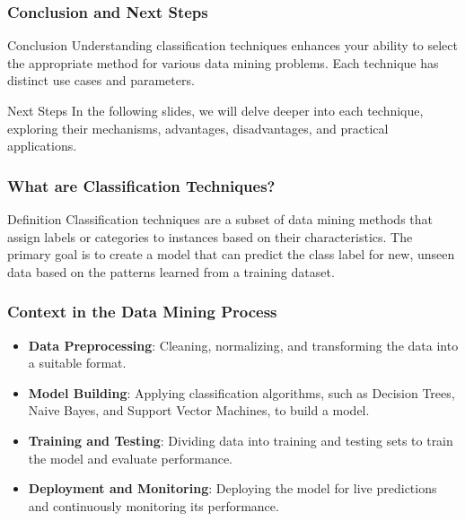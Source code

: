 \documentclass[aspectratio=169]{beamer}
\begin{document}
\begin{frame}[fragile]
    \frametitle{Conclusion and Next Steps}
    \begin{block}{Conclusion}
        Understanding classification techniques enhances your ability to select the appropriate method for various data mining problems. Each technique has distinct use cases and parameters.
    \end{block}

    \begin{block}{Next Steps}
        In the following slides, we will delve deeper into each technique, exploring their mechanisms, advantages, disadvantages, and practical applications.
    \end{block}
\end{frame}

\begin{frame}[fragile]
    \frametitle{What are Classification Techniques?}
    \begin{block}{Definition}
        Classification techniques are a subset of data mining methods that assign labels or categories to instances based on their characteristics. The primary goal is to create a model that can predict the class label for new, unseen data based on the patterns learned from a training dataset.
    \end{block}
\end{frame}

\begin{frame}[fragile]
    \frametitle{Context in the Data Mining Process}
    \begin{itemize}
        \item \textbf{Data Preprocessing}: Cleaning, normalizing, and transforming the data into a suitable format.
        \item \textbf{Model Building}: Applying classification algorithms, such as Decision Trees, Naive Bayes, and Support Vector Machines, to build a model.
        \item \textbf{Training and Testing}: Dividing data into training and testing sets to train the model and evaluate performance.
        \item \textbf{Deployment and Monitoring}: Deploying the model for live predictions and continuously monitoring its performance.
    \end{itemize}
\end{frame}
\end{document}
